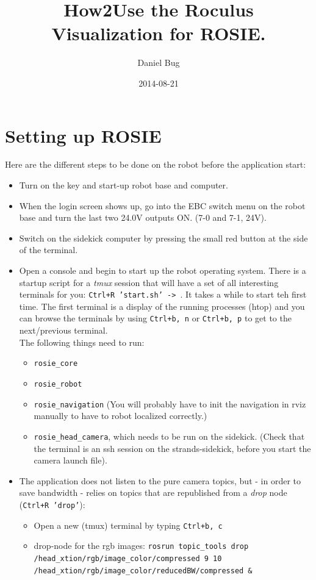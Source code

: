 \documentclass[a4paper, 12pt]{article}
\title{How2Use the Roculus Visualization for ROSIE.}
\date{2014-08-21}
\author{Daniel Bug}
\begin{document}
\maketitle

\section{Setting up ROSIE}
Here are the different steps to be done on the robot before the application start:
\begin{itemize}
\item Turn on the key and start-up robot base and computer.
\item When the login screen shows up, go into the EBC switch menu on the robot base and turn the last two 24.0V outputs ON. (7-0 and 7-1, 24V).
\item Switch on the sidekick computer by pressing the small red button at the side of the terminal.
\item Open a console and begin to start up the robot operating system. There is a startup script for a \emph{tmux} session that will have a set of all interesting terminals for you: \texttt{Ctrl+R 'start.sh' -> }. It takes a while to start teh first time. The first terminal is a display of the running processes (htop) and you can browse the terminals by using \texttt{Ctrl+b, n} or \texttt{Ctrl+b, p} to get to the next/previous terminal.\\ The following things need to run:
  \begin{itemize}
  \item \texttt{rosie\_core}
  \item \texttt{rosie\_robot}
  \item \texttt{rosie\_navigation} (You will probably have to init the navigation in rviz manually to have to robot localized correctly.)
  \item \texttt{rosie\_head\_camera}, which needs to be run on the sidekick. (Check that the terminal is an ssh session on the strands-sidekick, before you start the camera launch file).
  \end{itemize}
\item The application does not listen to the pure camera topics, but - in order to save bandwidth - relies on topics that are republished from a \emph{drop} node (\texttt{Ctrl+R 'drop'}):
  \begin{itemize}
  \item Open a new (tmux) terminal by typing \texttt{Ctrl+b, c}
  \item drop-node for the rgb images: \texttt{rosrun topic\_tools drop \\/head\_xtion/rgb/image\_color/compressed 9 10 \\/head\_xtion/rgb/image\_color/reducedBW/compressed \&}

\end{itemize}
\end{itemize}
\end{document}
